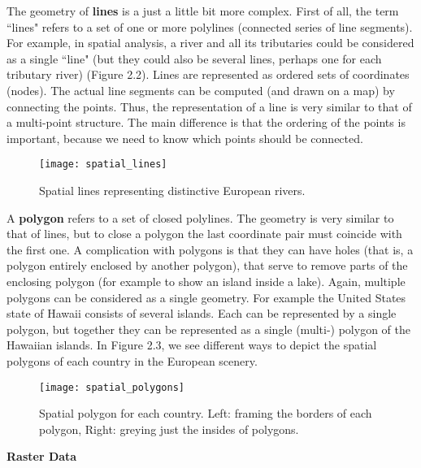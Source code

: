 \documentclass[12pt,a4paper,oneside]{book}
\theoremstyle{plain}
\theoremstyle{definition}
\begin{document}
{\vspace{2mm}
\noindent
The geometry of \textbf{lines} is a just a little bit more complex. First of all, the term ``lines" refers to a set of one or more polylines (connected series of line segments). For example, in spatial analysis, a river and all its tributaries could be considered as a single ``line" (but they could also be several lines, perhaps one for each tributary river) (Figure 2.2). Lines are represented as ordered sets of coordinates (nodes). The actual line segments can be computed (and drawn on a map) by connecting the points. Thus, the representation of a line is very similar to that of a multi-point structure. The main difference is that the ordering of the points is important, because we need to know which points should be connected.
\begin{figure}[h]
\begin{center}
\texttt{[image: spatial\_lines]}
\caption{Spatial lines representing distinctive European rivers.}
\end{center}
\end{figure}

\vspace{2mm}
\noindent
A \textbf{polygon} refers to a set of closed polylines. The geometry is very similar to that of lines, but to close a polygon the last coordinate pair must coincide with the first one. A complication with polygons is that they can have holes (that is, a polygon entirely enclosed by another polygon), that serve to remove parts of the enclosing polygon (for example to show an island inside a lake). Again, multiple polygons can be considered as a single geometry. For example the United States state of Hawaii consists of several islands. Each can be represented by a single polygon, but together they can be represented as a single (multi-) polygon of the Hawaiian islands. In Figure 2.3, we see different ways to depict the spatial polygons of each country in the European scenery.

\begin{figure}
\begin{center}
\texttt{[image: spatial\_polygons]}
\caption{Spatial polygon for each country. Left: framing the borders of each polygon, Right: greying just the insides of polygons.}
\end{center}
\end{figure}

\begin{flushleft}
\textbf{Raster Data}
\end{flushleft}

}
\end{document}
